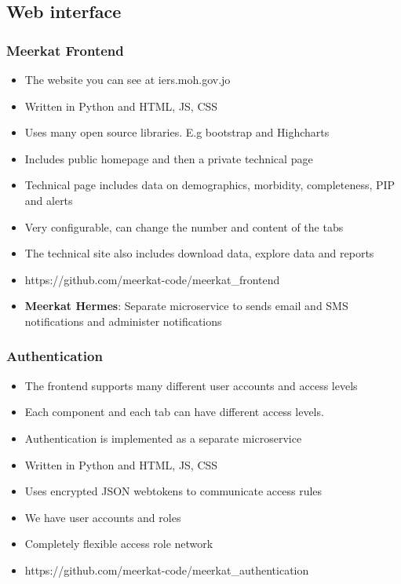 \documentclass{beamer}
\begin{document}
\subsection{Web interface}
\begin{frame}
  \frametitle{Meerkat Frontend}
  \begin{itemize}
  \item The website you can see at iers.moh.gov.jo
  \item Written in Python and HTML, JS, CSS
  \item Uses many open source libraries. E.g bootstrap and Highcharts
  \item Includes public homepage and then a private technical page
  \item Technical page includes data on demographics, morbidity, completeness, PIP and alerts
  \item Very configurable, can change the number and content of the tabs
  \item The technical site also includes download data, explore data and reports
  \item https://github.com/meerkat-code/meerkat\_frontend
  \item {\bf Meerkat Hermes}: Separate microservice to sends email and SMS notifications and administer notifications
  \end{itemize}
\end{frame}
\begin{frame}
  \frametitle{Authentication}
  \begin{itemize}
  \item The frontend supports many different user accounts and access levels
  \item Each component and each tab can have different access levels. 
  \item Authentication is implemented as a separate microservice
  \item Written in Python and HTML, JS, CSS
  \item Uses encrypted JSON webtokens to communicate access rules
  \item We have user accounts and roles
  \item Completely flexible access role network
  \item https://github.com/meerkat-code/meerkat\_authentication
  \end{itemize}
\end{frame}
\end{document}

